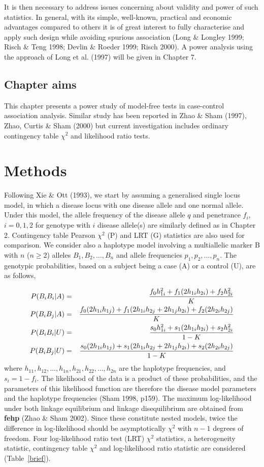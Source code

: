 It is then necessary to address issues concerning about validity and power of
such statistics.  In general, with its simple, well-known, practical and
economic advantages compared to others it is of great interest to fully
characterise and apply such design while avoiding spurious association (Long
\& Longley 1999; Risch \& Teng 1998; Devlin \& Roeder 1999; Risch 2000).  A
power analysis using the approach of Long et al.  (1997) will be given in
Chapter 7.


\subsection*{Chapter aims}

This chapter presents a power study of model-free tests in case-control
association analysis.  Similar study has been reported in Zhao \& Sham (1997),
Zhao, Curtis \& Sham (2000) but current investigation includes ordinary
contingency table $\chi^2$ and likelihood ratio tests.


\section{Methods}

Following Xie \& Ott (1993), we start by assuming a generalised single locus
model, in which a disease locus with one disease allele and one normal allele.
Under this model, the allele frequency of the disease allele $q$ and penetrance
$f_i$, $i=0,1,2$ for genotype with $i$ disease allele(s) are similarly defined
as in Chapter 2.  Contingency table Pearson $\chi^2$ (P) and LRT (G) statistics
are also used for comparison.  We consider also a haplotype model involving a
multiallelic marker B with $n$ ($n\ge 2$) alleles $B_1, B_2, \ldots, B_n$ and
allele frequencies $p_1, p_2,\ldots, p_n$.  The genotypic probabilities, based
on a subject being a case (A) or a control (U), are as follows,

\begin{eqnarray}
P(B_i B_i | A) &=& \frac{f_0 h_{1i}^2+f_1 (2h_{1i}h_{2i})+f_2 h_{2i}^2} {K}\cr
P(B_i B_j | A) &=& \frac{f_0 (2h_{1i}h_{1j})+f_1 (2h_{1i}h_{2j}
+2h_{1j}h_{2i})+f_2 (2h_{2i} h_{2j})} {K} \cr
P(B_i B_i | U) &=& \frac{s_0 h_{1i}^2+s_1 (2h_{1i}h_{2i})+s_2 h_{2i}^2} {1-K} \cr
P(B_i B_j | U) &=& \frac{s_0
(2h_{1i}h_{1j})+s_1(2h_{1i}h_{2j}+2h_{1j}h_{2i})+s_2(2h_{2i}h_{2j})}{1-K}
\label{gendist}
\end{eqnarray}
where $h_{11}, h_{12}, \ldots, h_{1n}, h_{21}, h_{22}, \ldots, h_{2n}$ are the
haplotype frequencies, and $s_i=1-f_i$.  The likelihood of the data is a
product of these probabilities, and the parameters of this likelihood function
are therefore the disease model parameters and the haplotype frequencies (Sham
1998, p159).  The maximum log-likelihood under both linkage equilibrium and
linkage disequilibrium are obtained from {\bf fehp} (Zhao \& Sham 2002).  Since
these constitute nested models, twice the difference in log-likelihood should
be asymptotically $\chi^2$ with $n-1$ degrees of freedom.  Four log-likelihood
ratio test (LRT) $\chi^2$ statistics, a heterogeneity statistic, contingency
table $\chi^2$ and log-likelihood ratio statistic are considered
(Table~\ref{brief}).

